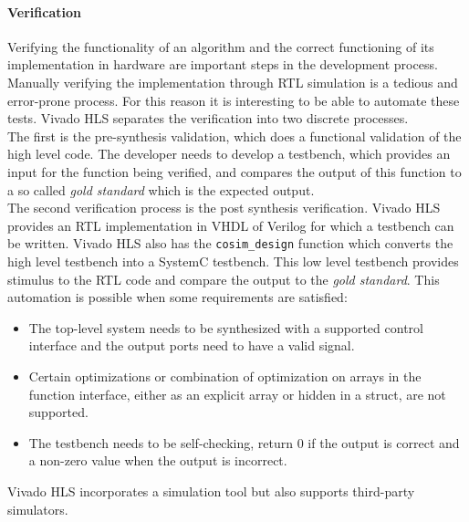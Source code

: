\paragraph{Verification}
Verifying the functionality of an algorithm and  the correct functioning of its implementation in hardware are important steps in the development process. Manually verifying the implementation through RTL simulation is a tedious and error-prone process. For this reason it is interesting to be able to automate these tests. Vivado HLS separates the verification into two discrete processes.\\ The first is the pre-synthesis validation, which does a functional validation of the high level code. The developer needs to develop a testbench, which provides an input for the function being verified, and compares the output of this function to a so called \emph{gold standard} which is the expected output.\\
The second verification process is the post synthesis verification. Vivado HLS provides an RTL implementation in VHDL of Verilog for which a testbench can be written. Vivado HLS also has the \texttt{cosim\_design} function which converts the high level testbench into a SystemC testbench. This low level testbench provides stimulus to the RTL code and compare the output to the \emph{gold standard}. This automation is possible when some requirements are satisfied:
\begin{itemize}
\item The top-level system needs to be synthesized with a supported control interface and the output ports need to have a valid signal.
\item Certain optimizations or combination of optimization on arrays in the function interface, either as an explicit array or hidden in a struct, are not supported.
\item The testbench needs to be self-checking, return 0 if the output is correct and a non-zero value when the output is incorrect.
\end{itemize}
Vivado HLS incorporates a simulation tool but also supports third-party simulators.

